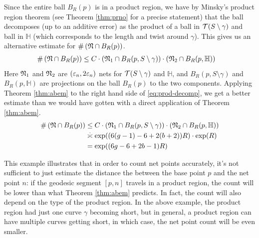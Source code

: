 \documentclass[12pt, reqno]{amsart}
\begin{document}
Since the entire ball $B_R(p)$ is in a product region, we have by Minsky's product region theorem (see Theorem \ref{thm:prno} for a precise statement) that the ball decomposes (up to an additive error) as the
product of a ball in $\mathcal{T}(S \setminus \gamma)$ and ball in $\mathbb{H}$ (which corresponds to the length and twist around $\gamma$).
This gives us an alternative estimate for $\#\left( \mathfrak{N} \cap B_R(p)\right)$.
\begin{align}
  \label{eq:prod-decomp}
  \#\left( \mathfrak{N} \cap B_R(p) \right) &\leq C \cdot \left( \mathfrak{N}_1 \cap B_R(p, S \setminus \gamma) \right) \cdot \left( \mathfrak{N}_2 \cap B_R(p, \mathbb{H})\right)
\end{align}
Here $\mathfrak{N}_1$ and $\mathfrak{N}_2$ are $(\varepsilon_n, 2\varepsilon_n)$ nets for $\mathcal{T}(S \setminus \gamma)$ and $\mathbb{H}$, and $B_R(p, S \setminus \gamma)$ and $B_R(p, \mathbb{H})$ are projections on the ball $B_R(p)$ to the two components.
Applying Theorem \ref{thm:abem} to the right hand side of \eqref{eq:prod-decomp}, we get a better estimate than we would have gotten with a direct application of Theorem \ref{thm:abem}.
\begin{align*}
  \#\left( \net \cap B_R(p) \right) &\leq C \cdot \left( \net_1 \cap B_R(p, S \setminus \gamma) \right) \cdot \left( \net_2 \cap B_R(p, \mathbb{H})\right) \\
                                           &\emul \exp((6(g-1)-6 + 2(b+2))R) \cdot \exp(R) \\
  &= \exp((6g-6+2b-1)R)
\end{align*}

This example illustrates that in order to count net points accurately, it's not sufficient to just estimate the distance the between the base point $p$ and the net point $n$: if the geodesic segment $[p, n]$ travels in a product region, the count will be lower than what Theorem \ref{thm:abem} predicts.
In fact, the count will also depend on the type of the product region.
In the above example, the product region had just one curve $\gamma$ becoming short, but in general, a product region can have multiple curves getting short, in which case, the net point count will be even smaller.
\end{document}

